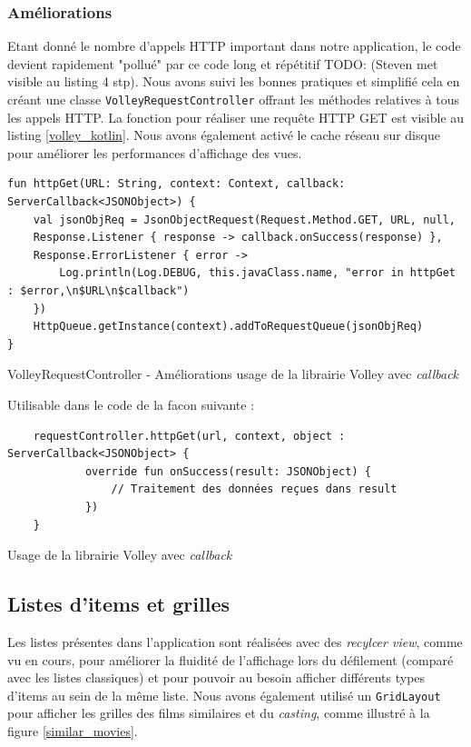 \subsubsection{Améliorations}
Etant donné le nombre d'appels HTTP important dans notre application, le code devient rapidement "pollué" par ce code long et répétitif TODO: (Steven met visible au listing 4 stp). Nous avons suivi les bonnes pratiques et simplifié cela en créant une classe \texttt{VolleyRequestController} offrant les méthodes relatives à tous les appels HTTP. La fonction pour réaliser une requête HTTP GET est visible au listing \ref{volley_kotlin}. Nous avons également activé le cache réseau sur disque pour améliorer les performances d'affichage des vues.
\bigbreak
\begin{code}
    \begin{verbatim}
fun httpGet(URL: String, context: Context, callback: ServerCallback<JSONObject>) {
    val jsonObjReq = JsonObjectRequest(Request.Method.GET, URL, null,
    Response.Listener { response -> callback.onSuccess(response) },
    Response.ErrorListener { error ->
        Log.println(Log.DEBUG, this.javaClass.name, "error in httpGet : $error,\n$URL\n$callback")
    })
    HttpQueue.getInstance(context).addToRequestQueue(jsonObjReq)
}
    \end{verbatim}
    \caption{VolleyRequestController - Améliorations usage de la librairie Volley avec \textit{callback}}
    \label{volley_kotlin}
\end{code}
\bigbreak

Utilisable dans le code de la facon suivante : 

\bigbreak
\begin{code}
    \begin{verbatim}
    requestController.httpGet(url, context, object : ServerCallback<JSONObject> {
            override fun onSuccess(result: JSONObject) {
                // Traitement des données reçues dans result
            })
    }
    \end{verbatim}
    \caption{Usage de la librairie Volley avec \textit{callback}}
    \label{volley_kotlin}
\end{code}
\bigbreak

\subsection{Listes d'items et grilles}
Les listes présentes dans l'application sont réalisées avec des \textit{recylcer view}, comme vu en cours, pour améliorer la fluidité de l'affichage lors du défilement (comparé avec les listes classiques) et pour pouvoir au besoin afficher différents types d'items au sein de la même liste. Nous avons également utilisé un \texttt{GridLayout} pour afficher les grilles des films similaires et du \textit{casting}, comme illustré à la figure \ref{similar_movies}.

